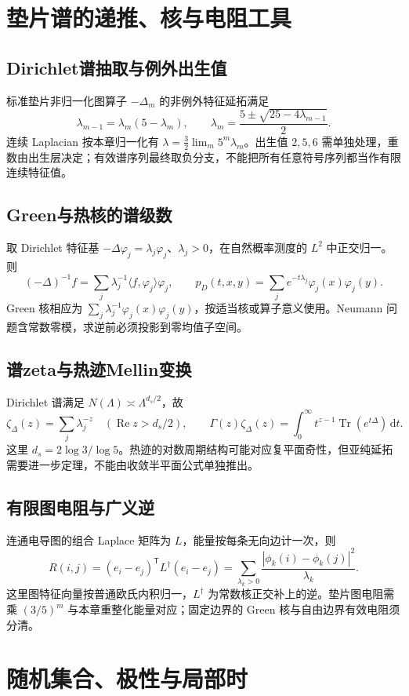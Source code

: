 \documentclass[../main.tex]{subfiles}
\begin{document}
\section{垫片谱的递推、核与电阻工具}
\subsection{Dirichlet谱抽取与例外出生值}
标准垫片非归一化图算子 $-\Delta_m$ 的非例外特征延拓满足
\[
\lambda_{m-1}=\lambda_m(5-\lambda_m),\qquad
\lambda_m=\frac{5\pm\sqrt{25-4\lambda_{m-1}}}{2}.
\]
连续 Laplacian 按本章归一化有 $\lambda=\frac32\lim_m5^m\lambda_m$。出生值 $2,5,6$ 需单独处理，重数由出生层决定；有效谱序列最终取负分支，不能把所有任意符号序列都当作有限连续特征值。
\subsection{Green与热核的谱级数}
取 Dirichlet 特征基 $-\Delta\varphi_j=\lambda_j\varphi_j$、$\lambda_j>0$，在自然概率测度的 $L^2$ 中正交归一。则
\[
(-\Delta)^{-1}f=\sum_j\lambda_j^{-1}\langle f,\varphi_j\rangle\varphi_j,
\qquad p_D(t,x,y)=\sum_je^{-t\lambda_j}\varphi_j(x)\varphi_j(y).
\]
Green 核相应为 $\sum_j\lambda_j^{-1}\varphi_j(x)\varphi_j(y)$，按适当核或算子意义使用。Neumann 问题含常数零模，求逆前必须投影到零均值子空间。
\subsection{谱zeta与热迹Mellin变换}
Dirichlet 谱满足 $N(\Lambda)\asymp\Lambda^{d_s/2}$，故
\[
\zeta_\Delta(z)=\sum_j\lambda_j^{-z}\quad(\operatorname{Re}z>d_s/2),\qquad
\Gamma(z)\zeta_\Delta(z)=\int_0^\infty t^{z-1}\operatorname{Tr}(e^{t\Delta})\,\mathrm dt.
\]
这里 $d_s=2\log3/\log5$。热迹的对数周期结构可能对应复平面奇性，但亚纯延拓需要进一步定理，不能由收敛半平面公式单独推出。
\subsection{有限图电阻与广义逆}
连通电导图的组合 Laplace 矩阵为 $L$，能量按每条无向边计一次，则
\[
R(i,j)=(e_i-e_j)^{\mathsf T}L^\dagger(e_i-e_j)
=\sum_{\lambda_k>0}\frac{|\phi_k(i)-\phi_k(j)|^2}{\lambda_k}.
\]
这里图特征向量按普通欧氏内积归一，$L^\dagger$ 为常数核正交补上的逆。垫片图电阻需乘 $(3/5)^m$ 与本章重整化能量对应；固定边界的 Green 核与自由边界有效电阻须分清。
\section{随机集合、极性与局部时}
\end{document}
